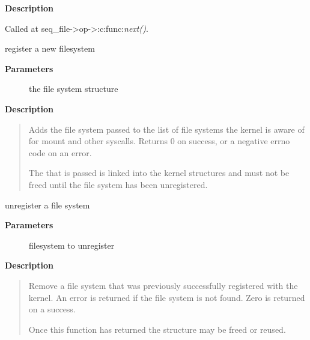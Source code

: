 \documentclass[a4paper,8pt,english]{sphinxmanual}
\begin{document}
\textbf{Description}

Called at seq\_file-\textgreater{}op-\textgreater{}:c:func:\emph{next()}.

\begin{fulllineitems}
\label{filesystems/index:c.register_filesystem}
register a new filesystem

\end{fulllineitems}


\textbf{Parameters}
\begin{description}
\item[{}] \leavevmode
the file system structure

\end{description}

\textbf{Description}
\begin{quote}

Adds the file system passed to the list of file systems the kernel
is aware of for mount and other syscalls. Returns 0 on success,
or a negative errno code on an error.

The  that is passed is linked into the kernel
structures and must not be freed until the file system has been
unregistered.
\end{quote}

\begin{fulllineitems}
\label{filesystems/index:c.unregister_filesystem}
unregister a file system

\end{fulllineitems}


\textbf{Parameters}
\begin{description}
\item[{}] \leavevmode
filesystem to unregister

\end{description}

\textbf{Description}
\begin{quote}

Remove a file system that was previously successfully registered
with the kernel. An error is returned if the file system is not found.
Zero is returned on a success.

Once this function has returned the  structure
may be freed or reused.
\end{quote}
\end{document}
